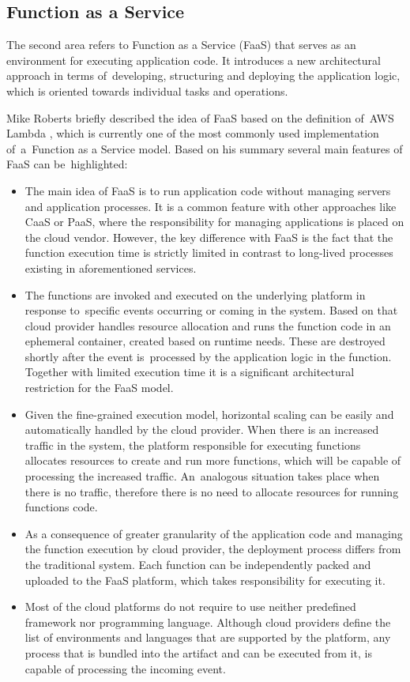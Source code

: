 \subsection{Function as a Service} \label{chapter:serverless-faas}

The second area refers to Function as a Service (FaaS) that serves as an environment for executing application code. It introduces a new architectural approach in terms of~developing, structuring and deploying the application logic, which is oriented towards individual tasks and operations.

Mike Roberts briefly described the idea of FaaS \cite{MartinFowlerServerless} based on the definition of~AWS Lambda \cite{AWSLambda}, which is currently one of the most commonly used implementation of~a~Function as a Service model. Based on his summary several main features of FaaS can be~highlighted:

\begin{itemize}
    \item The main idea of FaaS is to run application code without managing servers and application processes. It is a common feature with other approaches like CaaS or PaaS, where the responsibility for managing applications is placed on the cloud vendor. However, the key difference with FaaS is the fact that the function execution time is strictly limited in contrast to long-lived processes existing in aforementioned services.
    \item The functions are invoked and executed on the underlying platform in response to~specific events occurring or coming in the system. Based on that cloud provider handles resource allocation and runs the function code in an ephemeral container, created based on runtime needs. These are destroyed shortly after the event is~processed by the application logic in the function. Together with limited execution time it is a significant architectural restriction for the FaaS model.
    \item Given the fine-grained execution model, horizontal scaling can be easily and automatically handled by the cloud provider. When there is an increased traffic in the system, the platform responsible for executing functions allocates resources to create and run more functions, which will be capable of processing the increased traffic. An~analogous situation takes place when there is no traffic, therefore there is no need to allocate resources for running functions code.
    \item As a consequence of greater granularity of the application code and managing the function execution by cloud provider, the deployment process differs from the traditional system. Each function can be independently packed and uploaded to the FaaS platform, which takes responsibility for executing it.
    \item Most of the cloud platforms do not require to use neither predefined framework nor programming language. Although cloud providers define the list of environments and languages that are supported by the platform, any process that is bundled into the artifact and can be executed from it, is capable of processing the incoming event.
\end{itemize}

